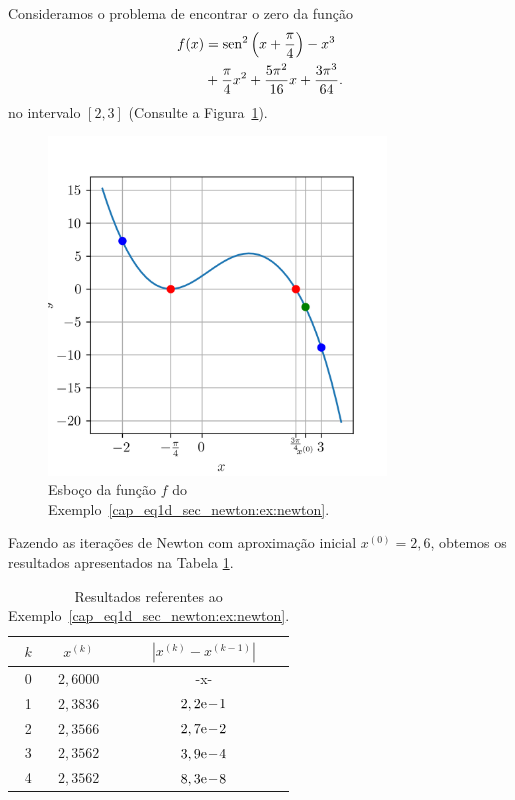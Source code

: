 \begin{ex}\label{cap_eq1d_sec_newton:ex:newton}
  Consideramos o problema de encontrar o zero da função
  \begin{equation}
    \begin{aligned}
      f(x) &= \operatorname{sen}^2\left(x+\frac{\pi}{4}\right) - x^3 \\
      &+ \frac{\pi}{4}x^2 + \frac{5\pi^2}{16}x + \frac{3\pi^3}{64}.
    \end{aligned}
  \end{equation}
  no intervalo $[2,3]$ (Consulte a Figura~\ref{cap_eq1d_sec_newton:fig:newton_ex}).

  \begin{figure}[H]
    \centering
    \includegraphics[width=0.8\textwidth]{./cap_eq1d/dados/fig_newton_ex/fig}
    \caption{Esboço da função $f$ do Exemplo~\ref{cap_eq1d_sec_newton:ex:newton}.}
  \label{cap_eq1d_sec_newton:fig:newton_ex}
\end{figure}


  Fazendo as iterações de Newton com aproximação inicial $x^{(0)}=2,6$, obtemos os resultados apresentados na Tabela \ref{tab:ex_Newton_exec}.

  \begin{table}[h!]
    \centering
    \caption{Resultados referentes ao Exemplo~\ref{cap_eq1d_sec_newton:ex:newton}.}
    \label{tab:ex_Newton_exec}
    \begin{tabular}{r|cc}
      $k$ & $x^{(k)}$ & $|x^{(k)}-x^{(k-1)}|$ \\\hline
      0 & $2,6000$ & -x-\\
      1 & $2,3836$ & $2,2\mathrm{e}\!-\!1$ \\
      2 & $2,3566$ & $2,7\mathrm{e}\!-\!2$ \\
      3 & $2,3562$ & $3,9\mathrm{e}\!-\!4$ \\
      4 & $2,3562$ & $8,3\mathrm{e}\!-\!8$ \\\hline
    \end{tabular}
  \end{table}


\end{ex}
